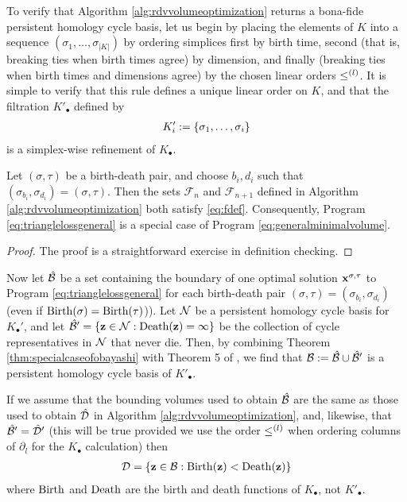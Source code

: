 \documentclass[utf8]{frontiers_suppmat} %
\begin{document}
To verify that Algorithm \ref{alg:rdvvolumeoptimization} returns a bona-fide persistent homology cycle basis, let us begin by placing the elements of $K$ into a sequence $(\sigma_1, \ldots, \sigma_{|K|})$ by ordering simplices first by birth time, second (that is, breaking ties when birth times agree) by dimension, and finally (breaking ties when birth times and dimensions agree) by the chosen linear orders $\le^{(l)}$.  It is simple to verify that this rule defines a unique linear order on $K$, and that the filtration $K'_\bullet$ defined by
    \begin{align*}
        K'_i : = \{ \sigma_1, \ldots, \sigma_i\}
    \end{align*}
is a simplex-wise refinement of $K_\bullet$.

\begin{theorem}
\label{thm:specialcaseofobayashi}
Let $(\sigma, \tau)$ be a birth-death pair, and choose $b_i, d_i$ such that  $(\sigma_{b_i}, \sigma_{d_i})  = (\sigma, \tau)$.  Then the sets ${\mathcal F}_n$ and ${\mathcal F}_{n+1}$  defined  in Algorithm \ref{alg:rdvvolumeoptimization} both satisfy \eqref{eq:fdef}.  Consequently, Program \eqref{eq:trianglelossgeneral} is a special case of Program \eqref{eq:generalminimalvolume}.
\end{theorem}
\begin{proof}
The proof is a straightforward exercise in definition checking.
\end{proof}

Now let $\hat {\mathcal B}$ be a set containing the boundary of one optimal solution $\mathbf{x}^{\sigma, \tau}$ to Program  \eqref{eq:trianglelossgeneral} for each birth-death pair $(\sigma, \tau) = (\sigma_{b_i}, \sigma_{d_i})$ (even if $\mathrm{Birth}(\sigma) = \mathrm{Birth}(\tau)$)).  Let $\mathcal N$ be a persistent homology cycle basis for $K_\bullet'$, and let $\hat {\mathcal B} ' = \{ {\mathbf z} \in \mathcal N : \mathrm{Death}({\mathbf z}) = \infty \}$ be the collection of cycle representatives in $\mathcal N$ that never die.  Then, by combining Theorem \ref{thm:specialcaseofobayashi} with Theorem 5 of \cite{Obayashi2018}, we find that $\mathcal B: = \hat {\mathcal B} \cup \hat {\mathcal B}'$ is a persistent homology cycle basis of $K'_\bullet$.  

If we assume that the bounding volumes used to obtain $\hat {\mathcal B}$ are the same as those used to obtain $\hat {\mathcal D}$ in Algorithm \ref{alg:rdvvolumeoptimization}, and, likewise, that $\hat {\mathcal B}' = \hat {\mathcal D}'$ (this will be true provided we use the order $\le^{(l)}$ when ordering columns of $\partial_l$ for the $K_\bullet$ calculation) then 
    \begin{align*}
        {\mathcal D} = \{{\mathbf z} \in \mathcal B : \mathrm{Birth}({\mathbf z}) < \mathrm{Death}({\mathbf z}) \}
    \end{align*}
where $\mathrm{Birth}$ and $\mathrm{Death}$ are the birth and death functions of $K_\bullet$, not $K'_\bullet$.
\end{document}
